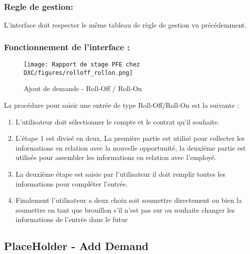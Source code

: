 \subsubsection{Regle de gestion:}

L’interface doit respecter le même tableau de règle de gestion vu précédemment.

\subsubsection{Fonctionnement de l'interface :}

\begin{figure}[H]
    \centering
    \texttt{[image: Rapport de stage PFE chez DXC/figures/rolloff\_rollon.png]}
    \caption{Ajout de demande - Roll-Off / Roll-On}
\end{figure}

La procédure pour saisir une entrée de type Roll-Off/Roll-On est la suivante :

\begin{enumerate}
    
    \item L'utilisateur doit sélectionner le compte et le contrat qu'il souhaite.
    \vspace{0.1cm}
    \item L'étape 1 est divisé en deux, La première partie est utilisé pour collecter les informations en relation avec la nouvelle opportunité, la deuxième partie est utilisée pour assembler les informations en relation avec l'employé.
    \vspace{0.1cm}
    \item La deuxième étape est saisie par l'utilisateur il doit remplir toutes les informations pour compléter l'entrée.
    \vspace{0.1cm}
    \item Finalement l'utilisateur a deux choix soit soumettre directement ou bien la soumettre en tant que brouillon s'il n'est pas sur ou souhaite changer les informations de l'entrée dans le futur

\end{enumerate}


\subsection{PlaceHolder - Add Demand}

